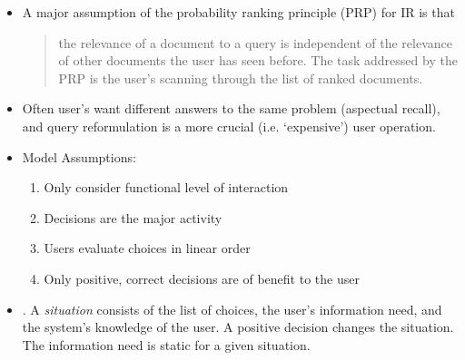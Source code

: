 \documentclass{article}
\begin{document}
\begin{itemize}

\item A major assumption of the probability ranking principle (PRP) for IR is that
    \begin{quote}
        the relevance of a document to a query is independent of the relevance of other documents the user has seen before.  The task addressed by the PRP is the user's scanning through the list of ranked documents.
    \end{quote}

\item Often user's want different answers to the same problem (aspectual recall), and query reformulation is a more crucial (i.e. `expensive') user operation.

\item Model Assumptions:
    \begin{enumerate}
        \item Only consider functional level of interaction \\
        \item Decisions are the major activity \\
        \item Users evaluate choices in linear order
        \item Only positive, correct decisions are of benefit to the user
    \end{enumerate}

\item {}.  A {\it situation} consists of the list of choices, the user's information need, and the system's knowledge of the user.  A positive decision changes the situation.  The information need is static for a given situation.


\end{itemize}
\end{document}
